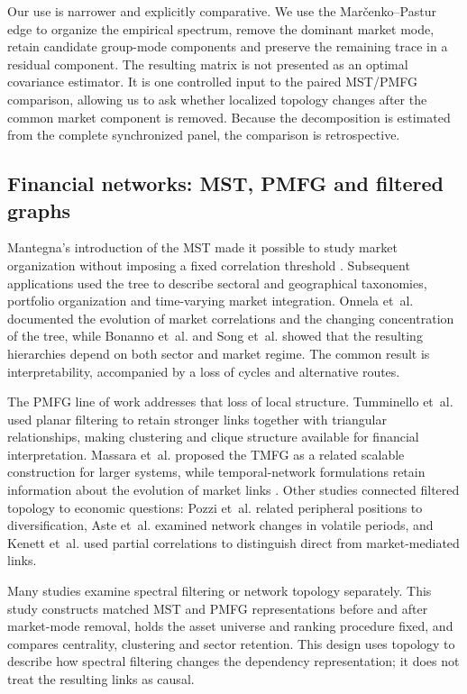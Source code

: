 Our use is narrower and explicitly comparative. We use the Mar\v{c}enko--Pastur edge to organize the empirical spectrum, remove the dominant market mode, retain candidate group-mode components and preserve the remaining trace in a residual component. The resulting matrix is not presented as an optimal covariance estimator. It is one controlled input to the paired MST/PMFG comparison, allowing us to ask whether localized topology changes after the common market component is removed. Because the decomposition is estimated from the complete synchronized panel, the comparison is retrospective.

\subsection{Financial networks: MST, PMFG and filtered graphs}

Mantegna's introduction of the MST made it possible to study market organization without imposing a fixed correlation threshold \cite{mantegna_1999_hierarchical}. Subsequent applications used the tree to describe sectoral and geographical taxonomies, portfolio organization and time-varying market integration. Onnela et~al. \cite{onnela_2003_dynamics} documented the evolution of market correlations and the changing concentration of the tree, while Bonanno et~al. \cite{bonanno_2004_networks} and Song et~al. \cite{song_2012_evolution} showed that the resulting hierarchies depend on both sector and market regime. The common result is interpretability, accompanied by a loss of cycles and alternative routes.

The PMFG line of work addresses that loss of local structure. Tumminello et~al. \cite{tumminello_2005_tool,tumminello_2010_correlation} used planar filtering to retain stronger links together with triangular relationships, making clustering and clique structure available for financial interpretation. Massara et~al. \cite{massara_2016_tmfg} proposed the TMFG as a related scalable construction for larger systems, while temporal-network formulations retain information about the evolution of market links \cite{zhao_2018_stock}. Other studies connected filtered topology to economic questions: Pozzi et~al. \cite{pozzi_2013_spread} related peripheral positions to diversification, Aste et~al. \cite{aste_2010_correlation} examined network changes in volatile periods, and Kenett et~al. \cite{kenett_2012_dominating} used partial correlations to distinguish direct from market-mediated links.

Many studies examine spectral filtering or network topology separately. This study constructs matched MST and PMFG representations before and after market-mode removal, holds the asset universe and ranking procedure fixed, and compares centrality, clustering and sector retention. This design uses topology to describe how spectral filtering changes the dependency representation; it does not treat the resulting links as causal.


